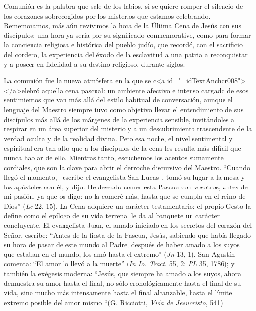 			\begin{body} Comunión es la\textbf{ }palabra que sale de los labios, si se quiere romper el silencio de los corazones sobrecogidos por los misterios que estamos celebrando. Rememoramos, más aún revivimos la hora de la Última Cena de Jesús con sus discípulos; una hora ya seria por su significado conmemorativo, como para formar la conciencia religiosa e histórica del pueblo judío, que recordó, con el sacrificio del cordero, la experiencia del éxodo de la esclavitud a una patria a reconquistar y a poseer en fidelidad a su destino religioso, durante siglos. \end{body}
			
			\begin{body}La comunión fue la nueva atmósfera en la que se c<a id="_idTextAnchor008"></a>elebró aquella cena pascual: un ambiente afectivo e intenso cargado de esos sentimientos que van más allá del estilo habitual de conversación, aunque el lenguaje del Maestro siempre tuvo como objetivo llevar el entendimiento de sus discípulos más allá de los márgenes de la experiencia sensible, invitándoles a respirar en un área superior del misterio y a un descubrimiento trascendente de la verdad oculta y de la realidad divina. Pero esa noche, el nivel sentimental y espiritual era tan alto que a los discípulos de la cena les resulta más difícil que nunca hablar de ello. Mientras tanto, escuchemos los acentos sumamente cordiales, que son la clave para abrir el derroche discursivo del Maestro. “Cuando llegó el momento, –escribe el evangelista San Lucas–, tomó su lugar a la mesa y los apóstoles con él, y dijo: He deseado comer esta Pascua con vosotros, antes de mi pasión, ya que os digo: no la comeré más, hasta que se cumpla en el reino de Dios” (\textit{Lc} 22, 15). La Cena adquiere un carácter testamentario: el propio Gesto la define como el epílogo de su vida terrena; le da al banquete un carácter concluyente. El evangelista Juan, el amado iniciado en los secretos del corazón del Señor, escribe: “Antes de la fiesta de la Pascua, Jesús, sabiendo que había llegado su hora de pasar de este mundo al Padre, después de haber amado a los suyos que estaban en el mundo, los amó hasta el extremo” (\textit{Jn} 13, 1). San Agustín comenta: “El amor lo llevó a la muerte” (\textit{In Io. Tract}. 55, 2: \textit{PL} 35, 1786); y también la exégesis moderna: “Jesús, que siempre ha amado a los suyos, ahora demuestra su amor hasta el final, no sólo cronológicamente hasta el final de su vida, sino mucho más intensamente hasta el final alcanzable, hasta el límite extremo posible del amor mismo “(G. Ricciotti, \textit{Vida de Jesucristo}, 541).\end{body}
			
